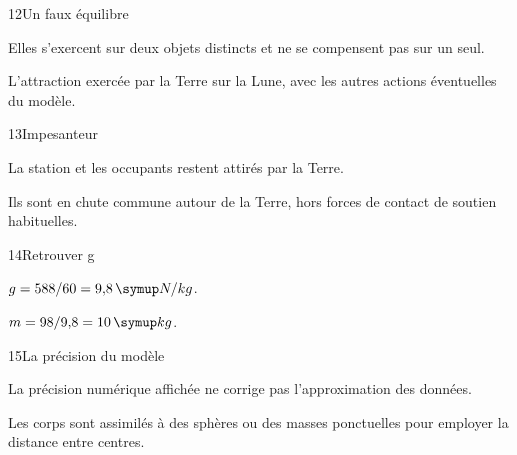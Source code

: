 \par\noindent\begin{minipage}{\linewidth}
\begin{corrige}{12}{Un faux équilibre}
\begin{questions}
\item Elles s’exercent sur deux objets distincts et ne se compensent pas sur un seul.
\item L’attraction exercée par la Terre sur la Lune, avec les autres actions éventuelles du modèle.
\end{questions}
\end{corrige}
\end{minipage}
\par\noindent\begin{minipage}{\linewidth}
\begin{corrige}{13}{Impesanteur}
\begin{questions}
\item La station et les occupants restent attirés par la Terre.
\item Ils sont en chute commune autour de la Terre, hors forces de contact de soutien habituelles.
\end{questions}
\end{corrige}
\end{minipage}
\par\noindent\begin{minipage}{\linewidth}
\begin{corrige}{14}{Retrouver g}
\begin{questions}
\item $g=588/60=9{,}8\unite{N/kg}$.
\item $m=98/9{,}8=10\unite{kg}$.
\end{questions}
\end{corrige}
\end{minipage}
\par\noindent\begin{minipage}{\linewidth}
\begin{corrige}{15}{La précision du modèle}
\begin{questions}
\item La précision numérique affichée ne corrige pas l’approximation des données.
\item Les corps sont assimilés à des sphères ou des masses ponctuelles pour employer la distance entre centres.
\end{questions}
\end{corrige}
\end{minipage}
